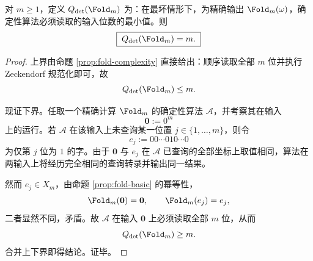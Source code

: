 \begin{theorem}[折叠算子的确定性位查询复杂度恰为分辨率]\label{thm:xi-fold-query-complexity-exact-m}
对 \(m\ge 1\)，定义 \(Q_{\det}(\Fold_m)\) 为：在最坏情形下，为精确输出 \(\Fold_m(\omega)\)，确定性算法必须读取的输入位数的最小值。则
\[
\boxed{\;
Q_{\det}(\Fold_m)=m.\;}
\]
\end{theorem}
\begin{proof}
上界由命题 \ref{prop:fold-complexity} 直接给出：顺序读取全部 \(m\) 位并执行 Zeckendorf 规范化即可，故
\[
Q_{\det}(\Fold_m)\le m.
\]

现证下界。任取一个精确计算 \(\Fold_m\) 的确定性算法 \(\mathcal A\)，并考察其在输入
\[
\mathbf0:=0^m
\]
上的运行。若 \(\mathcal A\) 在该输入上未查询某一位置 \(j\in\{1,\dots,m\}\)，则令
\[
e_j:=00\cdots010\cdots0
\]
为仅第 \(j\) 位为 \(1\) 的字。由于 \(\mathbf0\) 与 \(e_j\) 在 \(\mathcal A\) 已查询的全部坐标上取值相同，算法在两输入上将经历完全相同的查询转录并输出同一结果。

然而 \(e_j\in X_m\)，由命题 \ref{prop:fold-basic} 的幂等性，
\[
\Fold_m(\mathbf0)=\mathbf0,
\qquad
\Fold_m(e_j)=e_j,
\]
二者显然不同，矛盾。故 \(\mathcal A\) 在输入 \(\mathbf0\) 上必须读取全部 \(m\) 位，从而
\[
Q_{\det}(\Fold_m)\ge m.
\]
合并上下界即得结论。证毕。
\end{proof}

